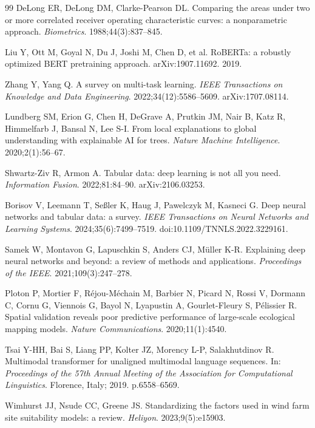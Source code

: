 \documentclass[12pt, a4paper]{article}
\begin{document}
\begin{thebibliography}{99}
DeLong ER, DeLong DM, Clarke-Pearson DL.
Comparing the areas under two or more correlated receiver
operating characteristic curves: a nonparametric approach.
\textit{Biometrics}. 1988;44(3):837--845.

Liu Y, Ott M, Goyal N, Du J, Joshi M, Chen D, et al.
RoBERTa: a robustly optimized BERT pretraining approach.
arXiv:1907.11692. 2019.

Zhang Y, Yang Q.
A survey on multi-task learning.
\textit{IEEE Transactions on Knowledge and Data Engineering}.
2022;34(12):5586--5609.
arXiv:1707.08114.

Lundberg SM, Erion G, Chen H, DeGrave A, Prutkin JM, Nair B,
Katz R, Himmelfarb J, Bansal N, Lee S-I.
From local explanations to global understanding with explainable
AI for trees.
\textit{Nature Machine Intelligence}.
2020;2(1):56--67.

Shwartz-Ziv R, Armon A.
Tabular data: deep learning is not all you need.
\textit{Information Fusion}.
2022;81:84--90.
arXiv:2106.03253.

Borisov V, Leemann T, Seßler K, Haug J,
Pawelczyk M, Kasneci G.
Deep neural networks and tabular data: a survey.
\textit{IEEE Transactions on Neural Networks and Learning Systems}.
2024;35(6):7499--7519.
doi:10.1109/TNNLS.2022.3229161.

Samek W, Montavon G, Lapuschkin S, Anders CJ, M\"uller K-R.
Explaining deep neural networks and beyond: a review of methods
and applications.
\textit{Proceedings of the IEEE}.
2021;109(3):247--278.

Ploton P, Mortier F, R\'ejou-M\'echain M, Barbier N, Picard N,
Rossi V, Dormann C, Cornu G, Viennois G, Bayol N, Lyapustin A,
Gourlet-Fleury S, P\'elissier R.
Spatial validation reveals poor predictive performance of
large-scale ecological mapping models.
\textit{Nature Communications}.
2020;11(1):4540.

Tsai Y-HH, Bai S, Liang PP, Kolter JZ, Morency L-P, Salakhutdinov R.
Multimodal transformer for unaligned multimodal language sequences.
In: \textit{Proceedings of the 57th Annual Meeting of the
Association for Computational Linguistics}. Florence, Italy;
2019. p.6558--6569.

Wimhurst JJ, Nsude CC, Greene JS.
Standardizing the factors used in wind farm site suitability
models: a review.
\textit{Heliyon}.
2023;9(5):e15903.


\end{thebibliography}
\end{document}
